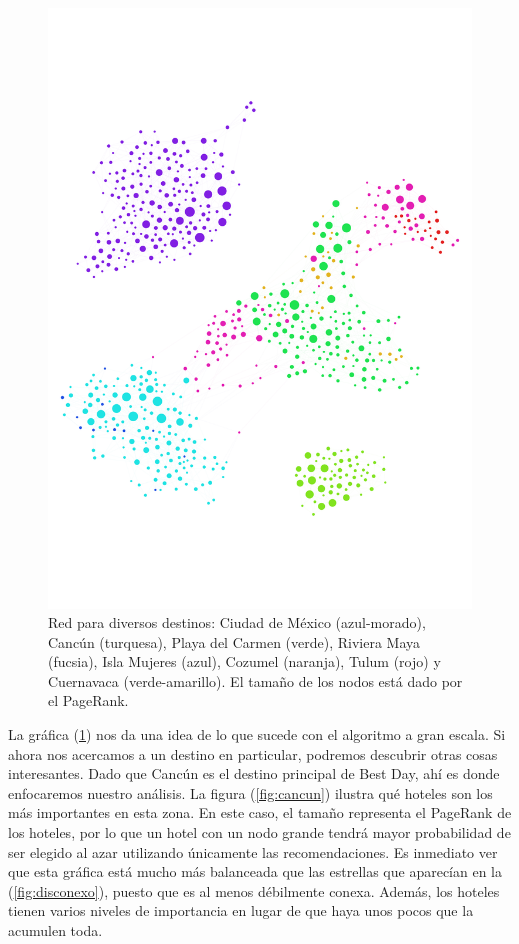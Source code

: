 \documentclass[12pt]{report}
\begin{document}
\begin{figure}[ht]
	\centering
	\includegraphics[width=\textwidth,
		trim = 0 300 0 300, clip]{imagenes/destinos2.png}
	\caption{\label{fig:destinos} Red para diversos destinos: Ciudad de México (azul-morado), Cancún (turquesa), Playa del Carmen (verde), Riviera Maya (fucsia), Isla Mujeres (azul), Cozumel (naranja), Tulum (rojo) y Cuernavaca (verde-amarillo). El tamaño de los nodos está dado por el PageRank.}
\end{figure}

La gráfica (\ref{fig:destinos}) nos da una idea de lo que sucede con el algoritmo a gran escala. Si ahora nos acercamos a un destino en particular, podremos descubrir otras cosas interesantes. Dado que Cancún es el destino principal de Best Day, ahí es donde enfocaremos nuestro análisis. La figura (\ref{fig:cancun}) ilustra qué hoteles son los más importantes en esta zona. En este caso, el tamaño representa el PageRank de los hoteles, por lo que un hotel con un nodo grande tendrá mayor probabilidad de ser elegido al azar utilizando únicamente las recomendaciones. Es inmediato ver que esta gráfica está mucho más balanceada que las estrellas que aparecían en la (\ref{fig:disconexo}), puesto que es al menos débilmente conexa. Además, los hoteles tienen varios niveles de importancia en lugar de que haya unos pocos que la acumulen toda.
\end{document}
